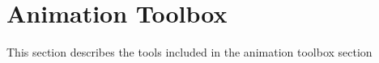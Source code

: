 \section{Animation Toolbox}
This section describes the tools included in the animation toolbox section
